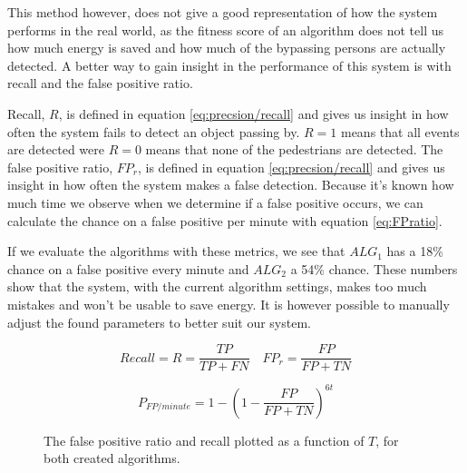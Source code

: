 This method however, does not give a good representation of how the system performs in the real world, as the fitness score of an algorithm does not tell us how much energy is saved and how much of the bypassing persons are actually detected. A better way to gain insight in the performance of this system is with recall and the false positive ratio.

Recall, $R$, is defined in equation \ref{eq:precsion/recall} and gives us insight in how often the system fails to detect an object passing by. $R = 1$ means that all events are detected were $R = 0$ means that none of the pedestrians are detected. The false positive ratio, $FP_r$, is defined in equation \ref{eq:precsion/recall} and gives us insight in how often the system makes a false detection. Because it's known how much time we observe when we determine if a false positive occurs, we can calculate the chance on a false positive per minute with equation \ref{eq:FPratio}.

If we evaluate the algorithms with these metrics, we see that $ALG_1$ has a 18\% chance on a false positive every minute and $ALG_2$ a 54\% chance. These numbers show that the system, with the current algorithm settings, makes too much mistakes and won't be usable to save energy. It is however possible to manually adjust the found parameters to better suit our system.

\begin{equation}
\label{eq:precsion/recall}
Recall = R = \frac{TP}{TP + FN}
\quad
FP_{r} = \frac{FP}{FP+TN}
\end{equation}

\begin{equation}
\label{eq:FPratio}
P_{FP/minute} = 1 - \left(1 - \frac{FP}{FP+TN}\right)^{6t}
\end{equation}

\begin{figure}
	\centering     %
	\caption{The false positive ratio and recall plotted as a function of $T$, for both created algorithms. \label{STDx_vs_Sx}}
\end{figure}

